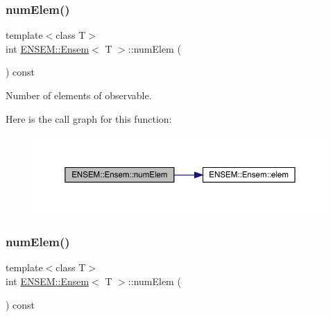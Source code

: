 \subsubsection{\texorpdfstring{numElem()}{numElem()}\hspace{0.1cm}{\footnotesize\ttfamily [1/3]}}
{\footnotesize\ttfamily template$<$class T$>$ \\
int \mbox{\hyperlink{classENSEM_1_1Ensem}{E\+N\+S\+E\+M\+::\+Ensem}}$<$ T $>$\+::num\+Elem (\begin{DoxyParamCaption}{ }\end{DoxyParamCaption}) const\hspace{0.3cm}{\ttfamily [inline]}}



Number of elements of observable. 

Here is the call graph for this function\+:
\nopagebreak
\begin{figure}[H]
\begin{center}
\leavevmode
\includegraphics[width=350pt]{d7/d3e/classENSEM_1_1Ensem_a495a563176192200eca2f16978158750_cgraph}
\end{center}
\end{figure}
\mbox{\label{classENSEM_1_1Ensem_a495a563176192200eca2f16978158750}} 
\subsubsection{\texorpdfstring{numElem()}{numElem()}\hspace{0.1cm}{\footnotesize\ttfamily [2/3]}}
{\footnotesize\ttfamily template$<$class T$>$ \\
int \mbox{\hyperlink{classENSEM_1_1Ensem}{E\+N\+S\+E\+M\+::\+Ensem}}$<$ T $>$\+::num\+Elem (\begin{DoxyParamCaption}{ }\end{DoxyParamCaption}) const\hspace{0.3cm}{\ttfamily [inline]}}



